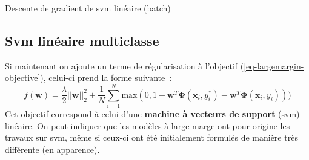 \documentclass[11pt,openany]{book}
\newcommand{\ac}[1]{{\sc #1}} %
\newcommand{\kw}[1]{{\bf #1}} %
\begin{document}
\begin{algorithm}[htbp]
\caption{\label{algo-linear-svm}Descente de gradient de \ac{svm}
  linéaire (batch)}
\end{algorithm}





\subsection{\ac{Svm} linéaire multiclasse}
Si maintenant on ajoute un terme de régularisation à l'objectif (\ref{eq-largemargin-objective}), celui-ci prend la forme suivante~:
\begin{equation}
f(\mathbf{w}) = \frac{\lambda}{2}||\mathbf{w}||_2^2 +
\frac{1}{N}\sum_{i=1}^N \text{max}(0, 1 + 
\mathbf{w}^T\boldsymbol\Phi(\mathbf{x}_i,y^*_i) - \mathbf{w}^T\boldsymbol\Phi(\mathbf{x}_i,y_i) ))
\end{equation}
Cet objectif correspond à celui d'une \kw{machine à vecteurs de support}
(\ac{svm}) linéaire. On peut indiquer que les modèles à large marge
ont pour origine les travaux sur \ac{svm}, même si ceux-ci ont été
initialement formulés de manière très différente (en apparence). 
\end{document}
